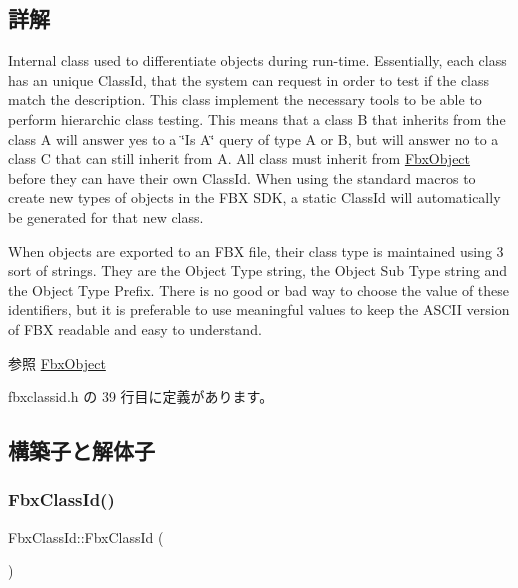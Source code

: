 \subsection{詳解}
Internal class used to differentiate objects during run-\/time. Essentially, each class has an unique Class\+Id, that the system can request in order to test if the class match the description. This class implement the necessary tools to be able to perform hierarchic class testing. This means that a class B that inherits from the class A will answer yes to a \char`\"{}\+Is A\char`\"{} query of type A or B, but will answer no to a class C that can still inherit from A. All class must inherit from \hyperlink{class_fbx_object}{Fbx\+Object} before they can have their own Class\+Id. When using the standard macros to create new types of objects in the F\+BX S\+DK, a static Class\+Id will automatically be generated for that new class.

When objects are exported to an F\+BX file, their class type is maintained using 3 sort of strings. They are the Object Type string, the Object Sub Type string and the Object Type Prefix. There is no good or bad way to choose the value of these identifiers, but it is preferable to use meaningful values to keep the A\+S\+C\+II version of F\+BX readable and easy to understand. \begin{DoxySeeAlso}{参照}
\hyperlink{class_fbx_object}{Fbx\+Object} 
\end{DoxySeeAlso}


 fbxclassid.\+h の 39 行目に定義があります。



\subsection{構築子と解体子}
\mbox{\label{class_fbx_class_id_afb4ee8374e852a1ea03c6c057ce15da8}} 
\subsubsection{\texorpdfstring{Fbx\+Class\+Id()}{FbxClassId()}\hspace{0.1cm}{\footnotesize\ttfamily [1/2]}}
{\footnotesize\ttfamily Fbx\+Class\+Id\+::\+Fbx\+Class\+Id (\begin{DoxyParamCaption}{ }\end{DoxyParamCaption})}




